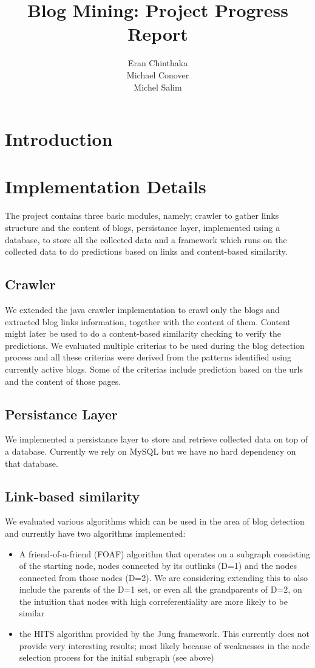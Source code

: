 \documentclass{article}
\author{Eran Chinthaka\\
  Michael Conover\\
  Michel Salim}
\title{Blog Mining: Project Progress Report}
\begin{document}
\maketitle

\section{Introduction}

\section{Implementation Details}
The project contains three basic modules, namely; crawler to gather links
structure and the content of blogs, persistance layer, implemented using a
database, to store all the collected data and a framework which runs on the
collected data to do predictions based on links and content-based similarity.

\subsection{Crawler}
We extended the java crawler implementation \cite{JavaCrawler} to crawl only the
blogs and extracted blog links information, together with the content of them. 
Content might later be used to do a content-based similarity checking to verify
the predictions. 
We evaluated multiple criterias to be used during the blog detection process and
all these criterias were derived from the patterns identified using currently
active blogs. Some of the criterias include prediction based on the urls and
the content of those pages. 

\subsection{Persistance Layer}
We implemented a persistance layer to store and retrieve collected data on top
of a database. Currently we rely on MySQL but we have no hard dependency on that
database. 

\subsection{Link-based similarity}
We evaluated various algorithms which can be used in the area of blog detection
and currently have two algorithms implemented:

\begin{itemize}
\item A friend-of-a-friend (FOAF) algorithm that operates on a
  subgraph consisting of the starting node, nodes connected by its
  outlinks (D=1) and the nodes connected from those nodes (D=2). We
  are considering extending this to also include the parents of the
  D=1 set, or even all the grandparents of D=2, on the intuition that
  nodes with high correferentiality are more likely to be similar

\item the HITS algorithm provided by the Jung framework. This
  currently does not provide very interesting results; most likely
  because of weaknesses in the node selection process for the initial
  subgraph (see above)
\end{itemize}
\end{document}
